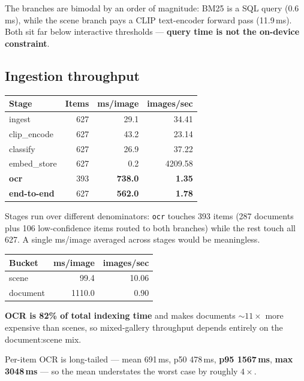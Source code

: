 \documentclass[11pt,a4paper]{article}
\newcommand{\code}[1]{\texttt{\small #1}}
\newcommand{\best}[1]{\textbf{#1}}
\begin{document}
The branches are bimodal by an order of magnitude: BM25 is a SQL query
(0.6\,ms), while the scene branch pays a CLIP text-encoder forward pass
(11.9\,ms). Both sit far below interactive thresholds --- \textbf{query time is
not the on-device constraint}.

\subsection{Ingestion throughput}

\begin{center}
\begin{tabular}{@{}lrrr@{}}
\toprule
\textbf{Stage} & \textbf{Items} & \textbf{ms/image} & \textbf{images/sec} \\
\midrule
ingest        & 627 & 29.1  & 34.41 \\
clip\_encode  & 627 & 43.2  & 23.14 \\
classify      & 627 & 26.9  & 37.22 \\
embed\_store  & 627 & 0.2   & 4209.58 \\
\textbf{ocr}  & 393 & \best{738.0} & \best{1.35} \\
\midrule
\textbf{end-to-end} & 627 & \best{562.0} & \best{1.78} \\
\bottomrule
\end{tabular}
\end{center}

Stages run over different denominators: \code{ocr} touches 393 items (287
documents plus 106 low-confidence items routed to both branches) while the rest
touch all 627. A single ms/image averaged across stages would be meaningless.

\begin{center}
\begin{tabular}{@{}lrr@{}}
\toprule
\textbf{Bucket} & \textbf{ms/image} & \textbf{images/sec} \\
\midrule
scene    & 99.4   & 10.06 \\
document & 1110.0 & 0.90 \\
\bottomrule
\end{tabular}
\end{center}

\textbf{OCR is 82\% of total indexing time} and makes documents ${\sim}11\times$
more expensive than scenes, so mixed-gallery throughput depends entirely on the
document:scene mix.

Per-item OCR is long-tailed --- mean 691\,ms, p50 478\,ms, \textbf{p95
1567\,ms}, \textbf{max 3048\,ms} --- so the mean understates the worst case by
roughly $4\times$.
\end{document}
